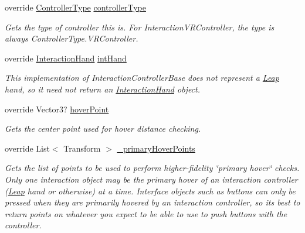 \begin{DoxyCompactItemize}
override \mbox{\hyperlink{namespace_leap_1_1_unity_1_1_interaction_a9752eb3e2905e8ebd134fff20c155e6b}{Controller\+Type}} \mbox{\hyperlink{class_leap_1_1_unity_1_1_interaction_1_1_interaction_x_r_controller_aae01e4ff3ef50d766b1a25d02b0e3e26}{controller\+Type}}
\begin{DoxyCompactList}\small\item\em Gets the type of controller this is. For Interaction\+V\+R\+Controller, the type is always Controller\+Type.\+V\+R\+Controller. \end{DoxyCompactList}\item 
override \mbox{\hyperlink{class_leap_1_1_unity_1_1_interaction_1_1_interaction_hand}{Interaction\+Hand}} \mbox{\hyperlink{class_leap_1_1_unity_1_1_interaction_1_1_interaction_x_r_controller_a482076db355cd75653f6d9efc8015409}{int\+Hand}}
\begin{DoxyCompactList}\small\item\em This implementation of Interaction\+Controller\+Base does not represent a \mbox{\hyperlink{namespace_leap_1_1_unity_1_1_leap}{Leap}} hand, so it need not return an \mbox{\hyperlink{class_leap_1_1_unity_1_1_interaction_1_1_interaction_hand}{Interaction\+Hand}} object. \end{DoxyCompactList}\item 
override Vector3? \mbox{\hyperlink{class_leap_1_1_unity_1_1_interaction_1_1_interaction_x_r_controller_a162487d30c42a8d26711bf80e75230c8}{hover\+Point}}
\begin{DoxyCompactList}\small\item\em Gets the center point used for hover distance checking. \end{DoxyCompactList}\item 
override List$<$ Transform $>$ \mbox{\hyperlink{class_leap_1_1_unity_1_1_interaction_1_1_interaction_x_r_controller_a79aa1c89e60ed3e606957e9c0d92a2b9}{\+\_\+primary\+Hover\+Points}}
\begin{DoxyCompactList}\small\item\em Gets the list of points to be used to perform higher-\/fidelity \char`\"{}primary hover\char`\"{} checks. Only one interaction object may be the primary hover of an interaction controller (\mbox{\hyperlink{namespace_leap_1_1_unity_1_1_leap}{Leap}} hand or otherwise) at a time. Interface objects such as buttons can only be pressed when they are primarily hovered by an interaction controller, so it\textquotesingle{}s best to return points on whatever you expect to be able to use to push buttons with the controller. \end{DoxyCompactList}\item 

\end{DoxyCompactItemize}
